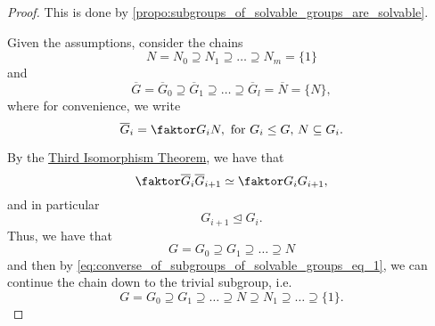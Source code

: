 \documentclass[notoc,notitlepage,nobib]{tufte-book}
\begin{document}
\begin{proof}
  \hlbnoted{$(\implies)$} This is done by
  \cref{propo:subgroups_of_solvable_groups_are_solvable}.
  
  \noindent
  \hlbnoted{$(\impliedby)$} Given the assumptions, consider the chains
  \begin{equation}\label{eq:converse_of_subgroups_of_solvable_groups_eq_1}
    N = N_0 \supseteq N_1 \supseteq \hdots \supseteq N_m = \{1\}
  \end{equation}
  and
  \begin{equation*}
    \overline{G} = \overline{G}_0 \supseteq \overline{G}_1 \supseteq \hdots
    \supseteq \overline{G}_l = \overline{N} = \{N\},
  \end{equation*}
  where for convenience, we write
  \begin{equation*}
    \overline{G}_i = \quotient{G_i}{N}, \text{ for } G_i \leq G, \, N \subseteq
    G_i.
  \end{equation*}

  By the
  \href{https://tex.japorized.ink/PMATH347S18/classnotes.pdf\#thm.41}{Third
  Isomorphism Theorem}, we have that
  \begin{equation*}
    \quotient{\overline{G}_i}{\overline{G}_{i+1}} \simeq
    \quotient{G_i}{G_{i+1}},
  \end{equation*}
  and in particular
  \begin{equation*}
    G_{i+1} \trianglelefteq G_i.
  \end{equation*}
  Thus, we have that
  \begin{equation*}
    G = G_0 \supseteq G_1 \supseteq \hdots \supseteq N
  \end{equation*}
  and then by \cref{eq:converse_of_subgroups_of_solvable_groups_eq_1}, we can
  continue the chain down to the trivial subgroup, i.e.
  \begin{equation*}
    G = G_0 \supseteq G_1 \supseteq \hdots \supseteq N \supseteq N_1 \supseteq
    \hdots \supseteq \{1\}.
  \end{equation*}
\end{proof}
\end{document}
